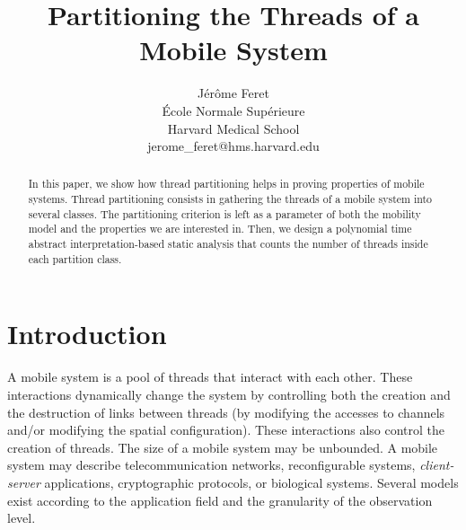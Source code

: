 \documentclass{article}
\begin{document}

\author{J{\'e}r{\^o}me Feret \\
{\'E}cole Normale Sup{\'e}rieure \\
Harvard Medical School\\
jerome\_feret@hms.harvard.edu}



\title{Partitioning the Threads of a Mobile System}



\maketitle

\begin{abstract}
In this paper, we show how thread partitioning helps in proving properties of  mobile systems.
Thread partitioning consists in gathering the threads of a mobile system into several classes. The partitioning criterion is left as a parameter of both the mobility model and the properties we are interested in. Then, we design a polynomial time abstract interpretation-based static analysis that counts the number of threads inside each partition class.
\end{abstract}

\section{Introduction}

A mobile system is a pool of threads that interact with each other.
These interactions dynamically change the system by controlling both the creation and the destruction of links  between threads (by modifying the accesses to channels and/or modifying the spatial configuration).
These interactions also control the creation of threads.
The size of a mobile system may be unbounded.
A mobile system may describe telecommunication networks, reconfigurable systems, \emph{client-server} applications, cryptographic protocols, or biological systems. Several models exist according to the application field and the granularity of the observation level.
\end{document}
